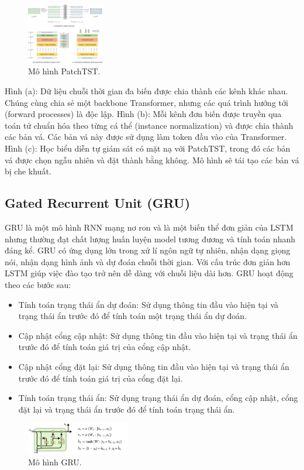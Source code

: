 \documentclass[conference]{IEEEtran}
\begin{document}
\begin{figure}[H]
    \centering
    \includegraphics[width=0.3\textwidth]{bibliography/modelPatchTST.png}
    \caption{Mô hình PatchTST.}
\end{figure}
Hình (a): Dữ liệu chuỗi thời gian đa biến được chia thành các kênh khác nhau. Chúng cùng chia sẻ một backbone Transformer, nhưng các quá trình hướng tới (forward processes) là độc lập.
Hình (b): Mỗi kênh đơn biến được truyền qua toán tử chuẩn hóa theo từng cá thể (instance normalization) và được chia thành các bản vá. Các bản vá này được sử dụng làm token đầu vào của Transformer.
Hình (c): Học biểu diễn tự giám sát có mặt nạ với PatchTST, trong đó các bản vá được chọn ngẫu nhiên và đặt thành bằng không. Mô hình sẽ tái tạo các bản vá bị che khuất.

\subsection{Gated Recurrent Unit (GRU)}
GRU là một mô hình RNN mạng nơ ron và là một biến thể đơn giản của LSTM nhưng thường đạt chất lượng huấn luyện model tương đương và tính toán nhanh đáng kể. GRU có ứng dụng lớn trong xử lí ngôn ngữ tự nhiên, nhận dạng giọng nói, nhận dạng hình ảnh và dự đoán chuỗi thời gian. Với cấu trúc đơn giản hơn LSTM giúp việc đào tạo trở nên dễ dàng với chuỗi liệu dài hơn. 
GRU hoạt động theo các bước sau:
\begin{itemize}
    \item Tính toán trạng thái ẩn dự đoán: Sử dụng thông tin đầu vào hiện tại và trạng thái ẩn trước đó để tính toán một trạng thái ẩn dự đoán.
    \item Cập nhật cổng cập nhật: Sử dụng thông tin đầu vào hiện tại và trạng thái ẩn trước đó để tính toán giá trị của cổng cập nhật.
    \item Cập nhật cổng đặt lại: Sử dụng thông tin đầu vào hiện tại và trạng thái ẩn trước đó để tính toán giá trị của cổng đặt lại.
    \item Tính toán trạng thái ẩn: Sử dụng trạng thái ẩn dự đoán, cổng cập nhật, cổng đặt lại và trạng thái ẩn trước đó để tính toán trạng thái ẩn.
\end{itemize}
\begin{figure}[H]
    \centering
    \includegraphics[width=0.4\textwidth]{bibliography/pictures/GRU.png}
    \caption{Mô hình GRU.}
\end{figure}
\end{document}
